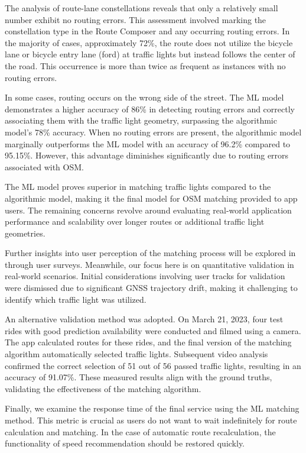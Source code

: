 The analysis of route-lane constellations reveals that only a relatively small number exhibit no routing errors. This assessment involved marking the constellation type in the Route Composer and any occurring routing errors. In the majority of cases, approximately 72\%, the route does not utilize the bicycle lane or bicycle entry lane (ford) at traffic lights but instead follows the center of the road. This occurrence is more than twice as frequent as instances with no routing errors.

In some cases, routing occurs on the wrong side of the street. The ML model demonstrates a higher accuracy of 86\% in detecting routing errors and correctly associating them with the traffic light geometry, surpassing the algorithmic model's 78\% accuracy. When no routing errors are present, the algorithmic model marginally outperforms the ML model with an accuracy of 96.2\% compared to 95.15\%. However, this advantage diminishes significantly due to routing errors associated with OSM.

The ML model proves superior in matching traffic lights compared to the algorithmic model, making it the final model for OSM matching provided to app users. The remaining concerns revolve around evaluating real-world application performance and scalability over longer routes or additional traffic light geometries.

Further insights into user perception of the matching process will be explored in  through user surveys. Meanwhile, our focus here is on quantitative validation in real-world scenarios. Initial considerations involving user tracks for validation were dismissed due to significant GNSS trajectory drift, making it challenging to identify which traffic light was utilized.

An alternative validation method was adopted. On March 21, 2023, four test rides with good prediction availability were conducted and filmed using a camera. The app calculated routes for these rides, and the final version of the matching algorithm automatically selected traffic lights. Subsequent video analysis confirmed the correct selection of 51 out of 56 passed traffic lights, resulting in an accuracy of 91.07\%. These measured results align with the ground truths, validating the effectiveness of the matching algorithm.

Finally, we examine the response time of the final service using the ML matching method. This metric is crucial as users do not want to wait indefinitely for route calculation and matching. In the case of automatic route recalculation, the functionality of speed recommendation should be restored quickly.

